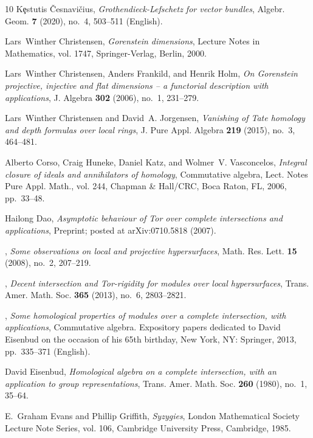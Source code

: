 \documentclass[11pt]{amsart}
\theoremstyle{definition}
\theoremstyle{definition}
\numberwithin{equation}{section}
\begin{document}
\begin{thebibliography}{10}
K{\c{e}}stutis {\v{C}}esnavi{\v{c}}ius, \emph{Grothendieck-{Lefschetz} for
  vector bundles}, Algebr. Geom. \textbf{7} (2020), no.~4, 503--511 (English).

Lars~Winther Christensen, \emph{Gorenstein dimensions}, Lecture Notes in
  Mathematics, vol. 1747, Springer-Verlag, Berlin, 2000.

Lars~Winther Christensen, Anders Frankild, and Henrik Holm, \emph{On
  {G}orenstein projective, injective and flat dimensions -- a functorial
  description with applications}, J. Algebra \textbf{302} (2006), no.~1,
  231--279.

Lars~Winther Christensen and David~A. Jorgensen, \emph{Vanishing of {T}ate
  homology and depth formulas over local rings}, J. Pure Appl. Algebra
  \textbf{219} (2015), no.~3, 464--481.

Alberto Corso, Craig Huneke, Daniel Katz, and Wolmer~V. Vasconcelos,
  \emph{Integral closure of ideals and annihilators of homology}, Commutative
  algebra, Lect. Notes Pure Appl. Math., vol. 244, Chapman \& Hall/CRC, Boca
  Raton, FL, 2006, pp.~33--48.

Hailong Dao, \emph{Asymptotic behaviour of {T}or over complete intersections
  and applications}, Preprint; posted at arXiv:0710.5818 (2007).

\bysame, \emph{Some observations on local and projective hypersurfaces}, Math.
  Res. Lett. \textbf{15} (2008), no.~2, 207--219.

\bysame, \emph{Decent intersection and {T}or-rigidity for modules over local
  hypersurfaces}, Trans. Amer. Math. Soc. \textbf{365} (2013), no.~6,
  2803--2821.

\bysame, \emph{Some homological properties of modules over a complete
  intersection, with applications}, Commutative algebra. Expository papers
  dedicated to David Eisenbud on the occasion of his 65th birthday, New York,
  NY: Springer, 2013, pp.~335--371 (English).

David Eisenbud, \emph{Homological algebra on a complete intersection, with an
  application to group representations}, Trans. Amer. Math. Soc. \textbf{260}
  (1980), no.~1, 35--64.

E.~Graham Evans and Phillip Griffith, \emph{Syzygies}, London Mathematical
  Society Lecture Note Series, vol. 106, Cambridge University Press, Cambridge,
  1985.


\end{thebibliography}
\end{document}
